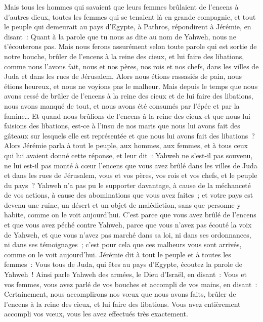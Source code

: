 \begin{multicols}{2}
Mais tous les hommes qui savaient que leurs femmes brûlaient de l'encens à d'autres dieux, toutes les femmes qui se tenaient là en grande compagnie, et tout le peuple qui demeurait au pays d'Egypte, à Pathros, répondirent à Jérémie, en disant~:
Quant à la parole que tu nous as dite au nom de Yahweh, nous ne t'écouterons pas.
Mais nous ferons assurément selon toute parole qui est sortie de notre bouche, brûler de l'encens à la reine des cieux, et lui faire des libations, comme nous l'avons fait, nous et nos pères, nos rois et nos chefs, dans les villes de Juda et dans les rues de Jérusalem. Alors nous étions rassasiés de pain, nous étions heureux, et nous ne voyions pas le malheur.
Mais depuis le temps que nous avons cessé de brûler de l'encens à la reine des cieux et de lui faire des libations, nous avons manqué de tout, et nous avons été consumés par l'épée et par la famine…
Et quand nous brûlions de l'encens à la reine des cieux et que nous lui faisions des libations, est-ce à l'insu de nos maris que nous lui avons fait des gâteaux sur lesquels elle est représentée et que nous lui avons fait des libations~?
Alors Jérémie parla à tout le peuple, aux hommes, aux femmes, et à tous ceux qui lui avaient donné cette réponse, et leur dit~:
Yahweh ne s'est-il pas souvenu, ne lui est-il pas monté à cœur l'encens que vous avez brûlé dans les villes de Juda et dans les rues de Jérusalem, vous et vos pères, vos rois et vos chefs, et le peuple du pays~?
Yahweh n'a pas pu le supporter davantage, à cause de la méchanceté de vos actions, à cause des abominations que vous avez faites~; et votre pays est devenu une ruine, un désert et un objet de malédiction, sans que personne y habite, comme on le voit aujourd'hui.
C'est parce que vous avez brûlé de l'encens et que vous avez péché contre Yahweh, parce que vous n'avez pas écouté la voix de Yahweh, et que vous n'avez pas marché dans sa loi, ni dans ses ordonnances, ni dans ses témoignages~; c'est pour cela que ces malheurs vous sont arrivés, comme on le voit aujourd'hui.
Jérémie dit à tout le peuple et à toutes les femmes~: Vous tous de Juda, qui êtes au pays d'Egypte, écoutez la parole de Yahweh~!
Ainsi parle Yahweh des armées, le Dieu d'Israël, en disant~: Vous et vos femmes, vous avez parlé de vos bouches et accompli de vos mains, en disant~: Certainement, nous accomplirons nos vœux que nous avons faits, brûler de l'encens à la reine des cieux, et lui faire des libations. Vous avez entièrement accompli vos vœux, vous les avez effectués très exactement.

\end{multicols}
